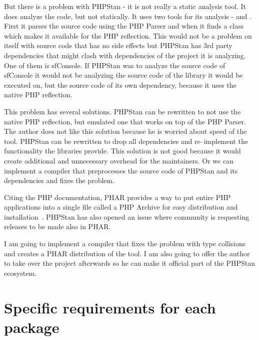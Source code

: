 But there is a problem with PHPStan - it is not really a static analysis tool. It does analyze the code, but not statically. It uses two tools for its analysis -  and . First it parses the source code using the PHP Parser and when it finds a class  which makes it available for the PHP reflection. This would not be a problem on itself with source code that has no side effects but PHPStan has 3rd party dependencies that might clash with dependencies of the project it is analyzing. One of them is \gls{sfConsole}. If PHPStan was to analyze the source code of \gls{sfConsole} it would not be analyzing the source code of the library it would be executed on, but the source code of its own dependency, because it uses the native PHP reflection.

This problem has several solutions. PHPStan can be rewritten to not use the native PHP reflection, but emulated one that works on top of the PHP Parser. The author does not like this solution because he is worried about speed of the tool. PHPStan can be rewritten to drop all dependencies and re--implement the functionality the libraries provide. This solution is not good because it would create additional and unnecessary overhead for the maintainers. Or we can implement a compiler that preprocesses the source code of PHPStan and its dependencies and fixes the problem.

Citing the PHP documentation, PHAR provides a way to put entire PHP applications into a single file called a PHP Archive for easy distribution and installation~\cite{php:phar}. PHPStan has also opened an issue  where community is requesting releases to be made also in PHAR.

I am going to implement a compiler that fixes the problem with type collisions and creates a PHAR distribution of the tool. I am also going to offer the author to take over the project afterwards so he can make it official part of the PHPStan ecosystem.




\section{Specific requirements for each package} \label{sec:roadmap:each-package}

